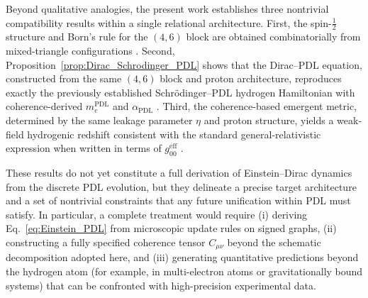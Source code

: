 \documentclass[11pt,a4paper]{article}
\theoremstyle{definition}
\newcommand{\PDL}{\mathrm{PDL}}
\newcommand{\alphaPDL}{\alpha_{\mathrm{PDL}}}
\newcommand{\etaL}{\eta} %
\begin{document}
Beyond qualitative analogies, the present work establishes three nontrivial compatibility results within a single relational architecture. First, the spin-$\tfrac{1}{2}$ structure and Born’s rule for the $(4,6)$ block are obtained combinatorially from mixed-triangle configurations \cite{Relational_Emergence_of_Born_s_Rule_and_a_Golden_Ratio_Active_Surface_in_PDL,Toward_a_Gleason_Type_Uniqueness_Theorem_for_Born_s_Rule_in_the_PDL_Framework}. Second, Proposition~\ref{prop:Dirac_Schrodinger_PDL} shows that the Dirac–PDL equation, constructed from the same $(4,6)$ block and proton architecture, reproduces exactly the previously established Schr\"odinger–PDL hydrogen Hamiltonian with coherence-derived $m_e^{\PDL}$ and $\alphaPDL$ \cite{Schodinger_PDL,Sketch_derivation_Schroedinger_PDL}. Third, the coherence-based emergent metric, determined by the same leakage parameter $\etaL$ and proton structure, yields a weak-field hydrogenic redshift consistent with the standard general-relativistic expression when written in terms of $g^{\mathrm{eff}}_{00}$ \cite{A_Topological_Reformulation_in_the_Projective_Dynamic_Logo_Framework_Hierarchical_Coherence_Filtering_and_the_Exponent_18_in_PDL,PDL_Global_Mapping_Structures_Results_Open_Problems}. 

\medskip

These results do not yet constitute a full derivation of Einstein–Dirac dynamics from the discrete PDL evolution, but they delineate a precise target architecture and a set of nontrivial constraints that any future unification within PDL must satisfy. In particular, a complete treatment would require (i) deriving Eq.~\eqref{eq:Einstein_PDL} from microscopic update rules on signed graphs, (ii) constructing a fully specified coherence tensor $C_{\mu\nu}$ beyond the schematic decomposition adopted here, and (iii) generating quantitative predictions beyond the hydrogen atom (for example, in multi-electron atoms or gravitationally bound systems) that can be confronted with high-precision experimental data.


\nocite{*}

\end{document}
